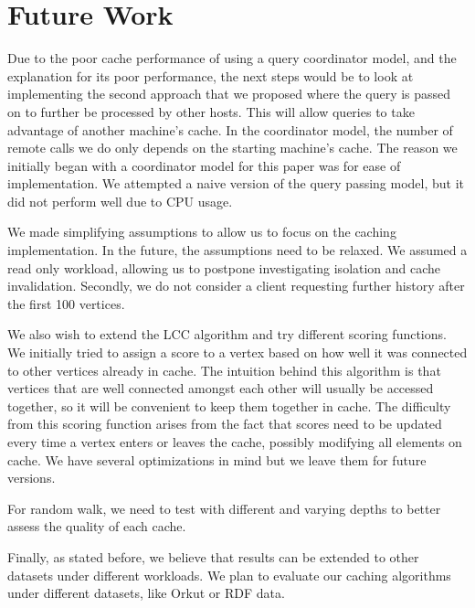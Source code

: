 
\section{Future Work}

Due to the poor cache performance of using a query coordinator model, and the
explanation for its poor performance, the next steps would be to look at
implementing the second approach that we proposed where the query is passed on
to further be processed by other hosts. This will allow queries to take
advantage of another machine's cache. In the coordinator model, the number of
remote calls we do only depends on the starting machine's cache. The reason we
initially began with a coordinator model for this paper was for ease of
implementation. We attempted a naive version of the query passing model, but it
did not perform well due to CPU usage.

We made simplifying assumptions to allow us to focus on the caching
implementation. In the future, the assumptions need to be relaxed. We assumed a
read only workload, allowing us to postpone investigating isolation and cache
invalidation. Secondly, we do not consider a client requesting further history
after the first 100 vertices.

We also wish to extend the LCC algorithm and try different scoring functions. We
initially tried to assign a score to a vertex based on how well it was connected to
other vertices already in cache. The intuition behind this algorithm is that vertices
that are well connected amongst each other will usually be accessed together, so
it will be convenient to keep them together in cache. The difficulty from this scoring
function arises from the fact that scores need to be updated every time a vertex
enters or leaves the cache, possibly modifying all elements on cache. We have
several optimizations in mind but we leave them for future versions.

For random walk, we need to test with different and varying depths to better
assess the quality of each cache.

Finally, as stated before, we believe that results can be extended to other datasets
under different workloads. We plan to evaluate our caching algorithms under
different datasets, like Orkut or RDF data.
